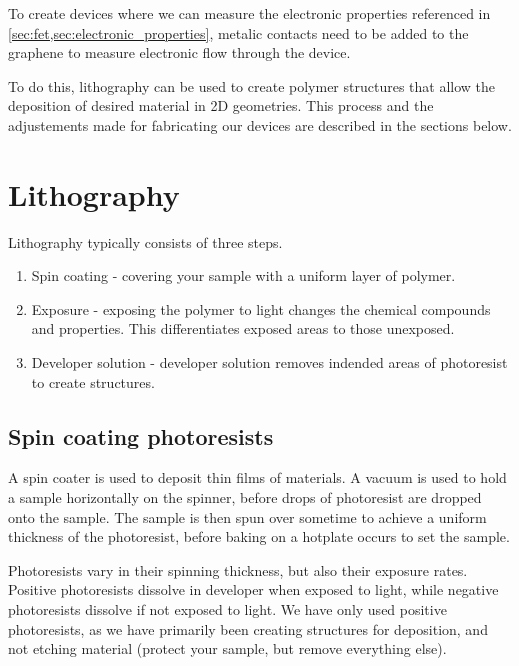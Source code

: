 \documentclass[../Matt_Gebert_Honours_Thesis.tex]{subfiles}
\begin{document}
	

	To create devices where we can measure the electronic properties referenced in \cref{sec:fet,sec:electronic_properties}, metalic contacts need to be added to the graphene to measure electronic flow through the device. 
	
	To do this, lithography can be used to create polymer structures that allow the deposition of desired material in 2D geometries. This process and the adjustements made for fabricating our devices are described in the sections below.

	\section{Lithography}\label{sec:lithography}
		Lithography typically consists of three steps.
		\begin{enumerate}
			\item Spin coating - covering your sample with a uniform layer of polymer.
			\item Exposure - exposing the polymer to light changes the chemical compounds and properties. This differentiates exposed areas to those unexposed.
			\item Developer solution - developer solution removes indended areas of photoresist to create structures.
		\end{enumerate}
		
	\subsection{Spin coating photoresists}\label{sec:resists}
		A spin coater is used to deposit thin films of materials. A vacuum is used to hold a sample horizontally on the spinner, before drops of photoresist are dropped onto the sample. The sample is then spun over sometime to achieve a uniform thickness of the photoresist, before baking on a hotplate occurs to set the sample.
		
		Photoresists vary in their spinning thickness, but also their exposure rates. Positive photoresists dissolve in developer when exposed to light, while negative photoresists dissolve if not exposed to light. We have only used positive photoresists, as we have primarily been creating structures for deposition, and not etching material (protect your sample, but remove everything else).
		
\end{document}
